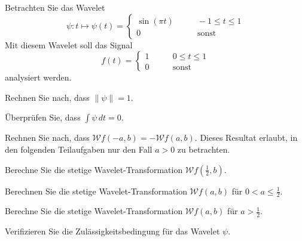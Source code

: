 Betrachten Sie das Wavelet
\[
\psi\colon
t\mapsto
\psi(t)
=
\begin{cases}
\sin(\pi t)&\qquad -1 \le t\le 1\\
0&\qquad\text{sonst}
\end{cases}
\]
Mit diesem Wavelet soll das Signal
\[
f(t)
= 
\begin{cases}
1&\qquad 0\le t\le 1\\
0&\qquad\text{sonst}
\end{cases}
\]
analysiert werden.
\begin{teilaufgaben}
\item Rechnen Sie nach, dass $\|\psi\|=1$.
\item Überprüfen Sie, dass $\int\psi\,dt=0$.
\item Rechnen Sie nach, dass $\mathcal{W}f(-a,b)=-\mathcal{W}f(a,b)$.
Dieses Resultat erlaubt, in den folgenden Teilaufgaben nur den Fall $a>0$
zu betrachten.
\item Berechne Sie die stetige Wavelet-Transformation $\mathcal{W}f(\frac12,b)$.
\item Berechnen Sie die stetige Wavelet-Transformation $\mathcal{W}f(a,b)$
für $0<a\le\frac12$.
\item Berechne Sie die stetige Wavelet-Transformation $\mathcal{W}f(a,b)$
für $a >\frac12$.
\item Verifizieren Sie die Zulässigkeitsbedingung für das Wavelet $\psi$.
\end{teilaufgaben}

